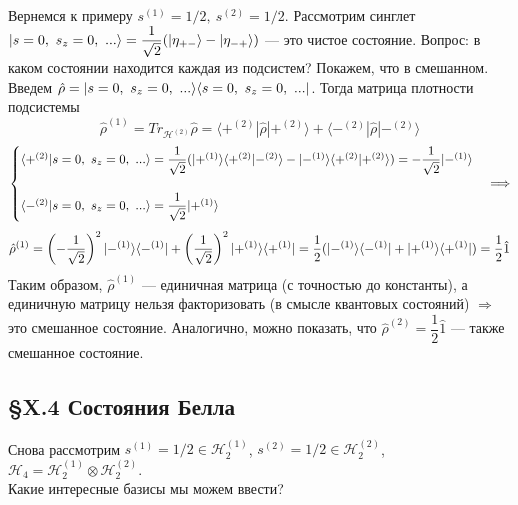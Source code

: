 Вернемся к примеру $s^{(1)} = 1/2,~ s^{(2)} = 1/2$. Рассмотрим синглет $| s=0,~s_z=0,~... \rangle = \dfrac{1}{\sqrt{2}}(| \eta_{+-} \rangle - | \eta_{-+} \rangle)$ --- это чистое состояние. Вопрос: в каком состоянии находится каждая из подсистем? Покажем, что в смешанном.\\
Введем $\hat{\rho} = | s=0,~s_z=0,~... \rangle\langle s=0,~s_z=0,~... |$. Тогда матрица плотности подсистемы
\[
\hat{\rho}^{(1)} = Tr_{\mathcal{H}^{(2)}}\hat{\rho} = \langle +^{(2)} | \hat{\rho} | +^{(2)} \rangle + \langle -^{(2)} | \hat{\rho} | -^{(2)} \rangle
\]
\[
\begin{cases}
	\langle +^{(2)} | s=0,~s_z=0,~... \rangle = \dfrac{1}{\sqrt{2}}(| +^{(1)} \rangle\langle +^{(2)} | -^{(2)} \rangle - | -^{(1)} \rangle\langle +^{(2)} | +^{(2)} \rangle) = -\dfrac{1}{\sqrt{2}}| -^{(1)} \rangle\\\\
	\langle -^{(2)} | s=0,~s_z=0,~... \rangle =\dfrac{1}{\sqrt{2}}| +^{(1)} \rangle\\
\end{cases} \Longrightarrow
\]
\[
\hat{\rho}^{(1)} = \left(-\dfrac{1}{\sqrt{2}}\right)^2| -^{(1)} \rangle\langle -^{(1)} | + \left(\dfrac{1}{\sqrt{2}}\right)^2| +^{(1)} \rangle\langle +^{(1)} | = \dfrac{1}{2}(| -^{(1)} \rangle\langle -^{(1)} | + | +^{(1)} \rangle\langle +^{(1)} |) = \dfrac{1}{2}\hat{1}
\]
Таким образом, $\hat{\rho}^{(1)}$ --- единичная матрица (с точностью до константы), а единичную матрицу нельзя факторизовать (в смысле квантовых состояний) $\Longrightarrow$ это смешанное состояние. Аналогично, можно показать, что $\hat{\rho}^{(2)} = \dfrac{1}{2}\hat{1}$ --- также смешанное состояние.\\




\subsection{\S X.4 Состояния Белла}
Снова рассмотрим $s^{(1)} = 1/2\in \mathcal{H}_2^{(1)}$, $s^{(2)} = 1/2\in \mathcal{H}_2^{(2)}$, $\mathcal{H}_4 = \mathcal{H}_2^{(1)}\otimes\mathcal{H}_2^{(2)}$.\\

Какие интересные базисы мы можем ввести?

